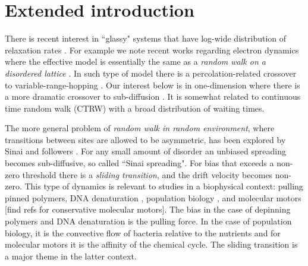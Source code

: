 \documentclass[aps,pre,floats,floatfix,twocolumn]{revtex4}
\newcommand{\rmrk}[1]{{\color[rgb]{0.6,0,0.1} #1}}
\begin{document}
\clearpage


\section{Extended introduction}

There is recent interest in ``glassy" systems that have log-wide distribution of 
relaxation rates \cite{glass1}. For example we note recent works regarding electron dynamics where 
the effective model is essentially the same as a {\em random walk on a disordered lattice} \cite{ege,egt}. 
In such type of model there is a percolation-related crossover 
to variable-range-hopping \cite{pts}. Our interest below is in one-dimension
where there is a more dramatic crossover to sub-diffusion \cite{Alexander}.
It is somewhat related to continuous time random walk (CTRW) 
with a broad distribution of waiting times\cite{BouchaudReview}.  

The more general problem of {\em random walk in random environment}, 
where transitions between sites are allowed to be asymmetric, 
has been explored by Sinai and followers \cite{Sinai,odh1,odh3,BouchaudReview}. 
For any small amount of disorder an unbiased spreading becomes sub-diffusive, 
so called ``Sinai spreading". 
For bias that exceeds a non-zero threshold there 
is a {\em sliding transition}, and the drift velocity becomes non-zero.
This type of dynamics is relevant to studies in a biophysical context: pulling
pinned polymers, DNA denaturation \cite{DNA1, DNA2}, 
population biology \cite{popbio,popbio2}, 
and molecular motors \rmrk{[find refs for conservative molecular motors]}. 
The bias in the case of depinning polymers and DNA denaturation is the pulling force.
In the case of population biology, it is the convective flow of bacteria relative 
to the nutrients and for molecular motors it is the affinity of the chemical cycle. 
The sliding transition is a major theme in the latter context.
\end{document}

